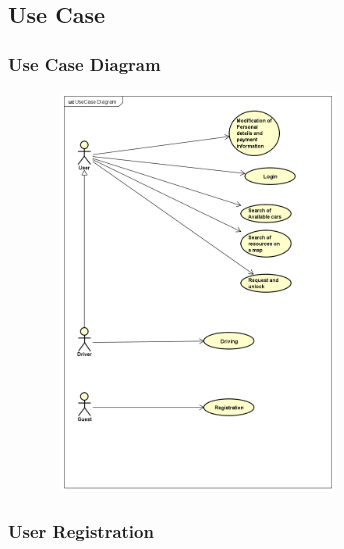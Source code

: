 \subsection{Use Case}

\subsubsection{Use Case Diagram}
	
	
\begin{figure}[h]

	\includegraphics[width=300px, height=400px]{img/UseCase_Diagram}
	
\end{figure}
	
\pagebreak



\subsubsection{User Registration}



	
	

